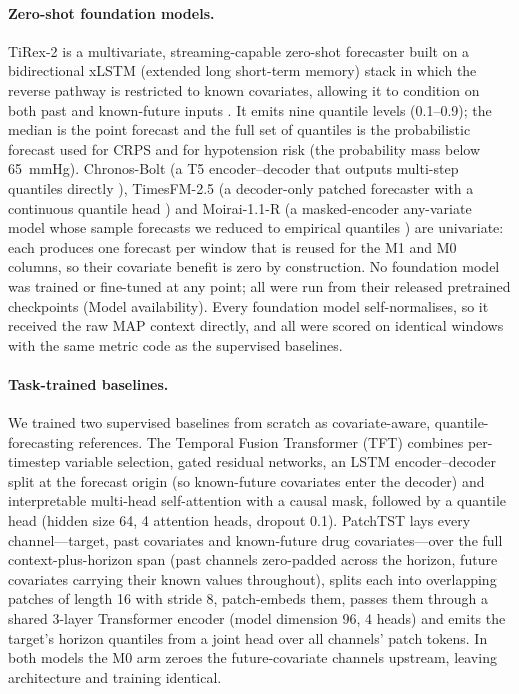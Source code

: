\documentclass[11pt]{article}
\begin{document}
\paragraph{Zero-shot foundation models.} TiRex-2 is a multivariate,
streaming-capable zero-shot forecaster built on a bidirectional xLSTM
(extended long short-term memory) stack in which the reverse pathway is
restricted to known covariates, allowing it to condition on both past and
known-future inputs \citep{Auer2025,Podest2026}. It emits nine quantile
levels (0.1--0.9); the median is the point forecast and the full set of
quantiles is the probabilistic forecast used for CRPS and for hypotension
risk (the probability mass below 65~mmHg). Chronos-Bolt (a T5
encoder--decoder that outputs multi-step quantiles directly \citep{Ansari2024}),
TimesFM-2.5 (a decoder-only patched forecaster with a continuous quantile
head \citep{Das2024}) and Moirai-1.1-R (a masked-encoder any-variate model
whose sample forecasts we reduced to empirical quantiles \citep{Woo2024}) are
univariate: each produces one forecast per window that is reused for the M1
and M0 columns, so their covariate benefit is zero by construction. No
foundation model was trained or fine-tuned at any point; all were run from
their released pretrained checkpoints (Model availability). Every foundation
model self-normalises, so it received the raw MAP context directly, and all
were scored on identical windows with the same metric code as the supervised
baselines.

\paragraph{Task-trained baselines.} We trained two supervised baselines from
scratch as covariate-aware, quantile-forecasting references. The Temporal
Fusion Transformer (TFT) \citep{Lim2021} combines per-timestep variable
selection, gated residual networks, an LSTM encoder--decoder split at the
forecast origin (so known-future covariates enter the decoder) and
interpretable multi-head self-attention with a causal mask, followed by a
quantile head (hidden size 64, 4 attention heads, dropout 0.1). PatchTST
\citep{Nie2023} lays every channel---target, past covariates and known-future
drug covariates---over the full context-plus-horizon span (past channels
zero-padded across the horizon, future covariates carrying their known values
throughout), splits each into overlapping patches of length 16 with stride 8,
patch-embeds them, passes them through a shared 3-layer Transformer encoder
(model dimension 96, 4 heads) and emits the target's horizon quantiles from a
joint head over all channels' patch tokens. In both models the M0 arm zeroes
the future-covariate channels upstream, leaving architecture and training
identical.
\end{document}
